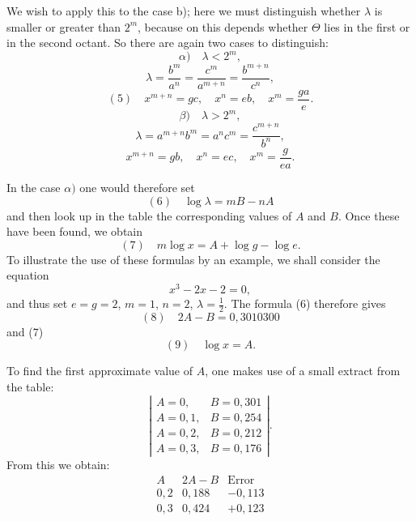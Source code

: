 
We wish to apply this to the case b); here we must distinguish whether $\lambda$ is smaller or greater than $2^m$, because on this depends whether $\Theta$ lies in the first or in the second octant. So there are again two cases to distinguish:
\[
\alpha)\quad \lambda < 2^m,
\]
\[
\lambda = \frac{b^m}{a^n} = \frac{c^m}{a^{m+n}} = \frac{b^{m+n}}{c^n},
\]
\[
(5)\quad x^{m+n} = gc, \quad x^n = eb, \quad x^m = \frac{ga}{e}.
\]
\[
\beta)\quad \lambda > 2^m,
\]
\[
\lambda = a^{m+n}b^m = a^n c^m = \frac{c^{m+n}}{b^n},
\]
\[
x^{m+n} = gb, \quad x^n = ec, \quad x^m = \frac{g}{ea}.
\]

In the case $\alpha)$ one would therefore set
\[
(6)\quad \log\lambda = mB - nA
\]
and then look up in the table the corresponding values of $A$ and $B$. Once these have been found, we obtain
\[
(7)\quad m\log x = A + \log g - \log e.
\]
To illustrate the use of these formulas by an example, we shall consider the equation
\[
x^3 - 2x - 2 = 0,
\]
and thus set $e = g = 2$, $m = 1$, $n = 2$, $\lambda = \frac{1}{2}$. The formula (6) therefore gives
\[
(8)\quad 2A - B = 0{,}3010300
\]
and (7)
\[
(9)\quad \log x = A.
\]

To find the first approximate value of $A$, one makes use of a small extract from the table:
\[
\left|
\begin{array}{ll}
A = 0, & B = 0{,}301 \\
A = 0{,}1, & B = 0{,}254 \\
A = 0{,}2, & B = 0{,}212 \\
A = 0{,}3, & B = 0{,}176
\end{array}
\right|.
\]
From this we obtain:
\[
\begin{array}{c|c|c}
A & 2A - B & \text{Error} \\
\hline
0{,}2 & 0{,}188 & -0{,}113 \\
0{,}3 & 0{,}424 & +0{,}123
\end{array}
\]
